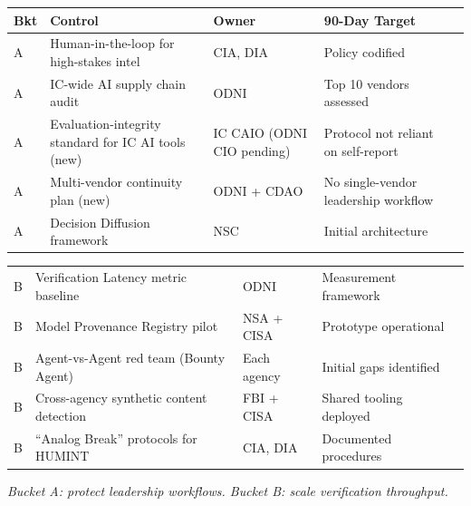 \documentclass[11pt,letterpaper]{article}
\begin{document}
\begin{recbox}
\begin{center}
\small
\begin{tabularx}{\linewidth}{ZY{0.29}Y{1.87}Y{0.9}Y{0.94}}
\toprule
\textbf{Bkt} & \textbf{Control} & \textbf{Owner} & \textbf{90-Day Target} \\
\midrule
A & Human-in-the-loop for high-stakes intel & CIA, DIA & Policy codified \\
A & IC-wide AI supply chain audit & ODNI & Top 10 vendors assessed \\
A & Evaluation-integrity standard for IC AI tools (new) & IC CAIO (ODNI CIO pending) & Protocol not reliant on self-report \\
A & Multi-vendor continuity plan (new) & ODNI + CDAO & No single-vendor leadership workflow \\
A & Decision Diffusion framework & NSC & Initial architecture \\
\end{tabularx}
\end{center}
\begin{center}
\small
\begin{tabularx}{\linewidth}{ZY{0.29}Y{1.87}Y{0.9}Y{0.94}}
B & Verification Latency metric baseline & ODNI & Measurement framework \\
B & Model Provenance Registry pilot & NSA + CISA & Prototype operational \\
B & Agent-vs-Agent red team (Bounty Agent) & Each agency & Initial gaps identified \\
B & Cross-agency synthetic content detection & FBI + CISA & Shared tooling deployed \\
B & ``Analog Break'' protocols for HUMINT & CIA, DIA & Documented procedures \\
\bottomrule
\end{tabularx}
\end{center}
\textit{Bucket A: protect leadership workflows. Bucket B: scale verification throughput.}
\end{recbox}
\end{document}
